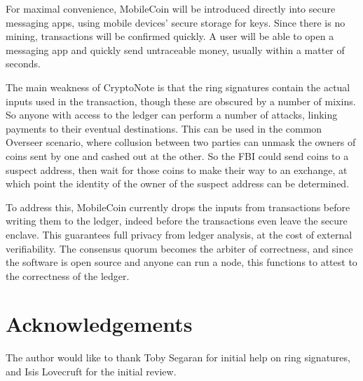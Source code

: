 \documentclass{article}
\begin{document}
For maximal convenience, MobileCoin will be introduced directly into secure messaging apps, using mobile devices' secure storage for keys.  Since there is no mining, transactions will be confirmed quickly.  A user will be able to open a messaging app and quickly send untraceable money, usually within a matter of seconds.

The main weakness of CryptoNote is that the ring signatures contain the actual inputs used in the transaction, though these are obscured by a number of mixins.  So anyone with access to the ledger can perform a number of attacks, linking payments to their eventual destinations.  This can be used in the common Overseer scenario, where collusion between two parties can unmask the owners of coins sent by one and cashed out at the other.  So the FBI could send coins to a suspect address, then wait for those coins to make their way to an exchange, at which point the identity of the owner of the suspect address can be determined.

To address this, MobileCoin currently drops the inputs from transactions before writing them to the ledger, indeed before the transactions even leave the secure enclave.  This guarantees full privacy from ledger analysis, at the cost of external verifiability.  The consensus quorum becomes the arbiter of correctness, and since the software is open source and anyone can run a node, this functions to attest to the correctness of the ledger.



\section{Acknowledgements}

The author would like to thank Toby Segaran for initial help on ring signatures, and Isis Lovecruft for the initial review.
\end{document}
